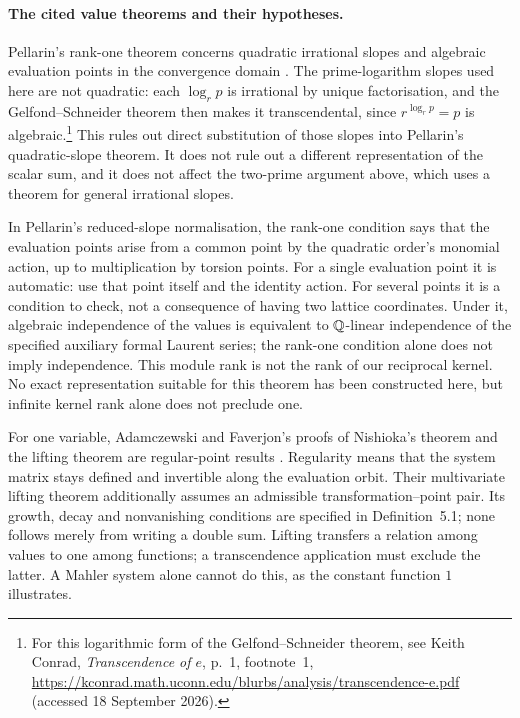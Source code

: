 \documentclass[11pt]{article}
\theoremstyle{remark}
\theoremstyle{plain}
\begin{document}
\paragraph{The cited value theorems and their hypotheses.}
Pellarin's rank-one theorem concerns quadratic irrational slopes and
algebraic evaluation points in the convergence domain
\cite[Theorem~1.1 and Remark~1.2, pp.~330--332]{pellarin2006}.
The prime-logarithm slopes used here are not quadratic: each $\log_r p$
is irrational by unique factorisation, and the Gelfond--Schneider theorem
then makes it transcendental, since $r^{\log_r p}=p$ is algebraic.\footnote{For this logarithmic form of the Gelfond--Schneider theorem, see Keith
Conrad, \emph{Transcendence of $e$}, p.~1, footnote~1,
\url{https://kconrad.math.uconn.edu/blurbs/analysis/transcendence-e.pdf}
(accessed 18 September 2026).}
This rules out direct substitution of those slopes into Pellarin's
quadratic-slope theorem.  It does not rule out a different representation
of the scalar sum, and it does not affect the two-prime argument above,
which uses a theorem for general irrational slopes.

In Pellarin's reduced-slope normalisation, the rank-one condition says
that the evaluation points arise from a common point by the quadratic
order's monomial action, up to
multiplication by torsion points.  For a single evaluation point it is
automatic: use that point itself and the identity action.  For several
points it is a condition to check, not a consequence of having two
lattice coordinates.  Under it, algebraic independence of the values is
equivalent to $\mathbb{Q}$-linear independence of the specified auxiliary formal
Laurent series; the rank-one condition alone does not imply independence.
This module rank is not the rank of our reciprocal kernel.  No exact
representation suitable for this theorem has been constructed here, but
infinite kernel rank alone does not preclude one.

For one variable, Adamczewski and Faverjon's proofs of Nishioka's theorem
and the lifting theorem are regular-point results
\cite[Theorems~1 and 2]{adamczewskifaverjon2023}.  Regularity means that the
system matrix stays defined and invertible along the evaluation orbit.
Their multivariate lifting theorem
\cite[Theorem~3.3]{adamczewskifaverjon2026} additionally assumes an admissible
transformation--point pair.  Its growth, decay and nonvanishing conditions
are specified in Definition~5.1; none follows merely from writing a double
sum.  Lifting transfers a relation among values to one among functions;
a transcendence application must exclude the latter.  A Mahler system
alone cannot do this, as the constant function $1$ illustrates.
\end{document}
